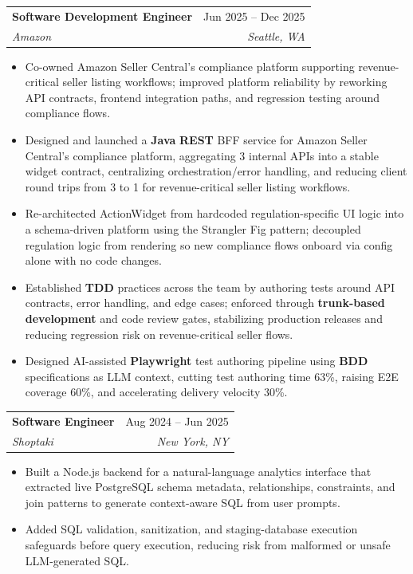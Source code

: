 \documentclass[letterpaper,10.5pt]{article}
\makeatletter
\newcommand{\resumeItem}[1]{
  \item\small{{#1 \vspace{-2pt}}}
}
\newcommand{\resumeSubheading}[4]{
  \vspace{1pt}\item
    \begin{tabular*}{0.97\textwidth}[t]{l@{\extracolsep{\fill}}r}
      \textbf{#1} & #2 \\
      \textit{\small#3} & \textit{\small #4} \\
    \end{tabular*}\vspace{-7pt}
}
\newcommand{\resumeItemListStart}{\begin{itemize}}
\newcommand{\resumeItemListEnd}{\end{itemize}\vspace{-5pt}}
\makeatother
\begin{document}
    \resumeSubheading
      {Software Development Engineer}{Jun 2025 -- Dec 2025}
      {Amazon}{Seattle, WA}
      \resumeItemListStart
        \resumeItem{Co-owned Amazon Seller Central's compliance platform supporting revenue-critical seller listing workflows; improved platform reliability by reworking API contracts, frontend integration paths, and regression testing around compliance flows.}
        \resumeItem{Designed and launched a \textbf{Java} \textbf{REST} BFF service for Amazon Seller Central's compliance platform, aggregating 3 internal APIs into a stable widget contract, centralizing orchestration/error handling, and reducing client round trips from 3 to 1 for revenue-critical seller listing workflows.}
        \resumeItem{Re-architected ActionWidget from hardcoded regulation-specific UI logic into a schema-driven platform using the Strangler Fig pattern; decoupled regulation logic from rendering so new compliance flows onboard via config alone with no code changes.}
        \resumeItem{Established \textbf{TDD} practices across the team by authoring tests around API contracts, error handling, and edge cases; enforced through \textbf{trunk-based development} and code review gates, stabilizing production releases and reducing regression risk on revenue-critical seller flows.}
        \resumeItem{Designed AI-assisted \textbf{Playwright} test authoring pipeline using \textbf{BDD} specifications as LLM context, cutting test authoring time 63\%, raising E2E coverage 60\%, and accelerating delivery velocity 30\%.}
      \resumeItemListEnd
        
      \resumeSubheading
        {Software Engineer}{Aug 2024 -- Jun 2025}
        {Shoptaki}{New York, NY}
          \resumeItemListStart
        \resumeItem{Built a Node.js backend for a natural-language analytics interface that extracted live PostgreSQL schema metadata, relationships, constraints, and join patterns to generate context-aware SQL from user prompts.}
        \resumeItem{Added SQL validation, sanitization, and staging-database execution safeguards before query execution, reducing risk from malformed or unsafe LLM-generated SQL.}
      \resumeItemListEnd
\end{document}
